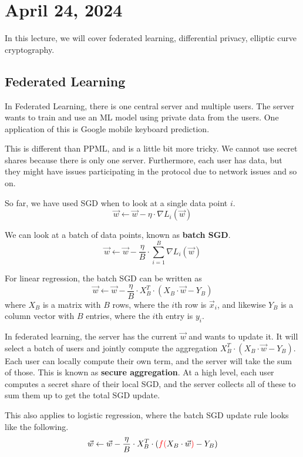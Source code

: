 \section{April 24, 2024}
\label{20240424}

In this lecture, we will cover federated learning, differential privacy, elliptic curve cryptography.

\subsection{Federated Learning}

In Federated Learning, there is one central server and multiple users. The server wants to train and use an ML model using private data from the users. One application of this is Google mobile keyboard prediction.

This is different than PPML, and is a little bit more tricky. We cannot use secret shares because there is only one server. Furthermore, each user has data, but they might have issues participating in the protocol due to network issues and so on.

So far, we have used SGD when to look at a single data point $i$. 
$$\vec{w} \gets \vec{w} - \eta \cdot \nabla L_i(\vec{w})$$

We can look at a batch of data points, known as \textbf{batch SGD}.
$$\vec{w} \gets \vec{w} - \frac{\eta}{B} \cdot \sum_{i = 1}^B\nabla L_i(\vec{w})$$

For linear regression, the batch SGD can be written as
$$\vec{w} \gets \vec{w} - \frac{\eta}{B} \cdot X_B^T \cdot (X_B \cdot \vec{w} - Y_B)$$
where $X_B$ is a matrix with $B$ rows, where the $i$th row is $\vec{x}_i$, and likewise $Y_B$ is a column vector with $B$ entries, where the $i$th entry is $y_i$.

In federated learning, the server has the current $\vec{w}$ and wants to update it. It will select a batch of users and jointly compute the aggregation $X_B^T \cdot (X_B \cdot \vec{w} - Y_B)$. Each user can locally compute their own term, and the server will take the sum of those. This is known as \textbf{secure aggregation}. At a high level, each user computes a secret share of their local SGD, and the server collects all of these to sum them up to get the total SGD update.

This also applies to logistic regression, where the batch SGD update rule looks like the following.
$$\vec{w} \gets \vec{w} - \frac{\eta}{B} \cdot X_B^T \cdot ({\color{red}f(}X_B \cdot \vec{w}{\color{red})} - Y_B)$$

